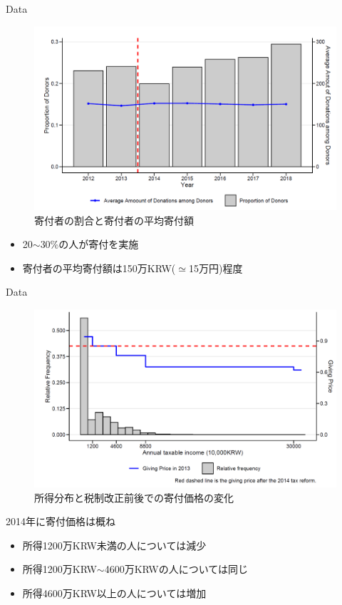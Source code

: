 \documentclass[dvipdfmx,10pt]{beamer}
\begin{document}
\begin{frame}{Data}
	\begin{figure}
		\centering
		\includegraphics[width=0.8\linewidth]{Fig_Average_donation}
		\caption{寄付者の割合と寄付者の平均寄付額}
		\label{fig:1}
	\end{figure}
\small
	\begin{itemize}
		\item 20$\sim$30\%の人が寄付を実施
		\item 寄付者の平均寄付額は150万KRW($\simeq$15万円)程度
	\end{itemize}
\end{frame}

\begin{frame}{Data}
	\begin{figure}
		\centering
		\includegraphics[width=0.7\linewidth]{Fig_Income_distribution}
		\caption{所得分布と税制改正前後での寄付価格の変化}
		\label{fig:2}
	\end{figure}
\small
	2014年に寄付価格は概ね
	\begin{itemize}
		\item 所得1200万KRW未満の人については減少
		\item 所得1200万KRW$\sim$4600万KRWの人については同じ
		\item 所得4600万KRW以上の人については増加
	\end{itemize}
\end{frame}
\end{document}
